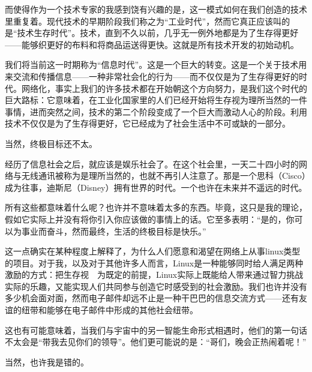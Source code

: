 而使得作为一个技术专家的我感到饶有兴趣的是，这一模式如何在我们创造的技术里重复着。现代技术的早期阶段我们称之为“工业时代”，然而它真正应该叫的是“技术生存时代”。技术，直到不久以前，几乎无一例外地都是为了生存得更好——能够织更好的布料和将商品运送得更快。这就是所有技术开发的初始动机。

我们将当前这一时期称为“信息时代”。这是一个巨大的转变。这是一个关于技术用来交流和传播信息——一种非常社会化的行为——而不仅仅是为了生存得更好的时代。网络化，事实上我们的许多技术都在开始朝这个方向努力，是我们这个时代的巨大路标：它意味着，在工业化国家里的人们已经开始将生存视为理所当然的一件事情，进而突然之间，技术的第二个阶段变成了一个巨大而激动人心的阶段。利用技术不仅仅是为了生存得更好，它已经成为了社会生活中不可或缺的一部分。

当然，终极目标还不太。

经历了信息社会之后，就应该是娱乐社会了。在这个社会里，一天二十四小时的网络与无线通讯被称为是理所当然的，也就不再引人注意了。那是一个思科（Cisco）成为往事，迪斯尼（Disney）拥有世界的时代。一个也许在未来并不遥远的时代。

所有这些都意味着什么呢？也许并不意味着太多的东西。毕竟，这只是我的理论，假如它实际上并没有将你引入你应该做的事情上的话。它至多表明：“是的，你可以为事业而奋斗，然而最终，生活的终极目标是快乐。”

这一点确实在某种程度上解释了，为什么人们愿意和渴望在网络上从事linux类型的项目。对于我，以及对于其他许多人而言，Linux是一种能够同时给人满足两种激励的方式：把生存视　为既定的前提，Linux实际上既能给人带来通过智力挑战实际的乐趣，又能实现人们共同参与创造它时感受到的社会激励。我们也许并没有多少机会面对面，然而电子邮件却远不止是一种干巴巴的信息交流方式——还有友谊的纽带和能够在电子邮件中形成的其他社会纽带。

这也有可能意味着，当我们与宇宙中的另一智能生命形式相遇时，他们的第一句话不太会是“带我去见你们的领导”。他们更可能说的是：“哥们，晚会正热闹着呢！”

当然，也许我是错的。

 
